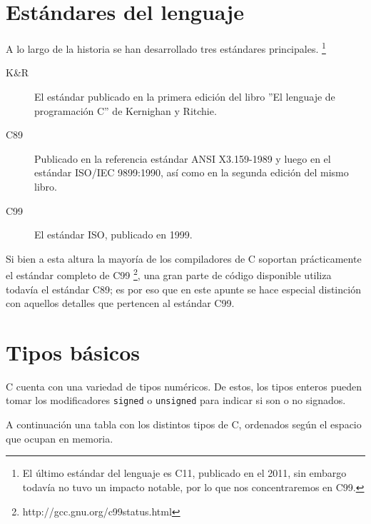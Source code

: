 \section{Estándares del lenguaje}

A lo largo de la historia se han desarrollado tres estándares principales.
\footnote{El último estándar del lenguaje es C11, publicado en el 2011, sin
embargo todavía no tuvo un impacto notable, por lo que nos concentraremos en
C99.}

\begin{description}
\item[K\&R] El estándar publicado en la primera edición del libro
''El lenguaje de programación C'' de Kernighan y Ritchie.
\item[C89] Publicado en la referencia estándar ANSI X3.159-1989 y luego en el
estándar ISO/IEC 9899:1990, así como en la segunda edición del mismo libro.
\item[C99] El estándar ISO, publicado en 1999.
\end{description}

Si bien a esta altura la mayoría de los compiladores de C soportan
prácticamente el estándar completo de C99
\footnote{http://gcc.gnu.org/c99status.html}, una gran parte de código
disponible utiliza todavía el estándar C89; es por eso que en este apunte se
hace especial distinción con aquellos detalles que pertencen al estándar C99.

\section{Tipos básicos}

C cuenta con una variedad de tipos numéricos.  De estos, los tipos enteros
pueden tomar los modificadores \lstinline!signed! o \lstinline!unsigned! para
indicar si son o no signados.

A continuación una tabla con los distintos tipos de C, ordenados según el
espacio que ocupan en memoria.

